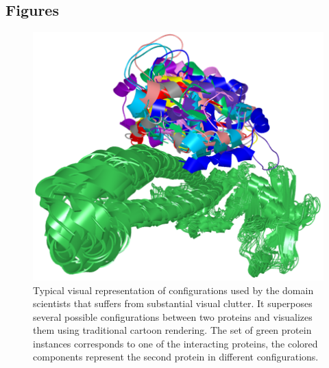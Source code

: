 \documentclass{bmcart}
\begin{document}
\begin{backmatter}



\section*{Figures}
  \begin{figure}[h!]
  \centering
  \includegraphics[width=\columnwidth]{images/figure1.png}
 \caption{
	Typical visual representation of configurations used by the domain scientists that suffers 		from substantial visual clutter. It superposes several possible configurations between two 		proteins and visualizes them using traditional cartoon rendering. The set of green protein 		instances corresponds to one of the interacting proteins, the colored components represent 		the second protein in different configurations.}
  \label{fig:problem}
\end{figure}


\end{backmatter}
\end{document}
